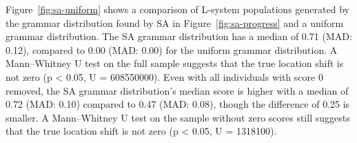 Figure~\ref{fig:sa-uniform} shows a comparison of \gls{L-system} populations generated by the grammar distribution found by \gls{SA} in Figure~\ref{fig:sa-progress} and a uniform grammar distribution.
The \gls{SA} grammar distribution has a median of 0.71 (MAD: 0.12), compared to 0.00 (MAD: 0.00) for the uniform grammar distribution.
A Mann–Whitney U test on the full sample suggests that the true location shift is not zero (p < 0.05, U = 608550000).
Even with all individuals with score 0 removed, the \gls{SA} grammar distribution's median score is higher with a median of 0.72 (MAD: 0.10) compared to 0.47 (MAD: 0.08), though the difference of 0.25 is smaller.
A Mann–Whitney U test on the sample without zero scores still suggests that the true location shift is not zero (p < 0.05, U = 1318100).

